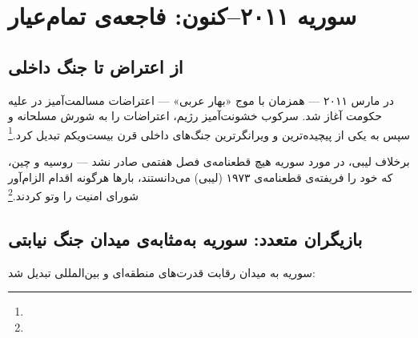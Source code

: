 \section{سوریه ۲۰۱۱–کنون: فاجعه‌ی تمام‌عیار}
\label{sec:ch10-syria}

\subsection{از اعتراض تا جنگ داخلی}
\label{subsec:ch10-syria-civilwar}

در مارس ۲۰۱۱ — همزمان با موج «بهار عربی» — اعتراضات مسالمت‌آمیز در  علیه حکومت  آغاز شد. سرکوب خشونت‌آمیز رژیم، اعتراضات را به شورش مسلحانه و سپس به یکی از پیچیده‌ترین و ویرانگرترین جنگ‌های داخلی قرن بیست‌ویکم تبدیل کرد.\footnote{}

برخلاف لیبی، در مورد سوریه هیچ قطعنامه‌ی فصل هفتمی صادر نشد — روسیه و چین، که خود را فریفته‌ی قطعنامه‌ی ۱۹۷۳ (لیبی) می‌دانستند، بارها هرگونه اقدام الزام‌آور شورای امنیت را وتو کردند.\footnote{}

\subsection{بازیگران متعدد: سوریه به‌مثابه‌ی میدان جنگ نیابتی}
\label{subsec:ch10-syria-actors}

سوریه به میدان رقابت قدرت‌های منطقه‌ای و بین‌المللی تبدیل شد:

